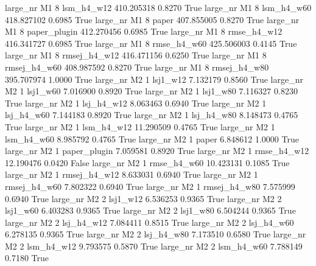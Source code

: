   large_nr       M1                 8   lsm_h4_w12  410.205318      0.8270    True
  large_nr       M1                 8   lsm_h4_w60  418.827102      0.6985    True
  large_nr       M1                 8        paper  407.855005      0.8270    True
  large_nr       M1                 8 paper_plugin  412.270456      0.6985    True
  large_nr       M1                 8  rmse_h4_w12  416.341727      0.6985    True
  large_nr       M1                 8  rmse_h4_w60  425.506003      0.4145    True
  large_nr       M1                 8 rmsej_h4_w12  416.471156      0.6250    True
  large_nr       M1                 8 rmsej_h4_w60  408.987592      0.8270    True
  large_nr       M1                 8 rmsej_h4_w80  395.707974      1.0000    True
  large_nr       M2                 1     lsj1_w12    7.132179      0.8560    True
  large_nr       M2                 1     lsj1_w60    7.016900      0.8920    True
  large_nr       M2                 1     lsj1_w80    7.116327      0.8230    True
  large_nr       M2                 1   lsj_h4_w12    8.063463      0.6940    True
  large_nr       M2                 1   lsj_h4_w60    7.144183      0.8920    True
  large_nr       M2                 1   lsj_h4_w80    8.148473      0.4765    True
  large_nr       M2                 1   lsm_h4_w12   11.290509      0.4765    True
  large_nr       M2                 1   lsm_h4_w60    8.985792      0.4765    True
  large_nr       M2                 1        paper    6.848612      1.0000    True
  large_nr       M2                 1 paper_plugin    7.059581      0.8920    True
  large_nr       M2                 1  rmse_h4_w12   12.190476      0.0420   False
  large_nr       M2                 1  rmse_h4_w60   10.423131      0.1085    True
  large_nr       M2                 1 rmsej_h4_w12    8.633031      0.6940    True
  large_nr       M2                 1 rmsej_h4_w60    7.802322      0.6940    True
  large_nr       M2                 1 rmsej_h4_w80    7.575999      0.6940    True
  large_nr       M2                 2     lsj1_w12    6.536253      0.9365    True
  large_nr       M2                 2     lsj1_w60    6.403283      0.9365    True
  large_nr       M2                 2     lsj1_w80    6.504244      0.9365    True
  large_nr       M2                 2   lsj_h4_w12    7.084411      0.8515    True
  large_nr       M2                 2   lsj_h4_w60    6.278135      0.9365    True
  large_nr       M2                 2   lsj_h4_w80    7.173510      0.6580    True
  large_nr       M2                 2   lsm_h4_w12    9.793575      0.5870    True
  large_nr       M2                 2   lsm_h4_w60    7.788149      0.7180    True

